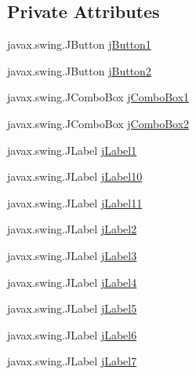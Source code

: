 \subsection*{Private Attributes}
\begin{DoxyCompactItemize}
\item 
javax.\+swing.\+J\+Button \mbox{\hyperlink{class_interfaz_package_1_1_alta_libro_texto_a22a96730cf3c923a67cc8ef92053d06a}{j\+Button1}}
\item 
javax.\+swing.\+J\+Button \mbox{\hyperlink{class_interfaz_package_1_1_alta_libro_texto_a2a68befdaadc6870fcd31afa3214839b}{j\+Button2}}
\item 
javax.\+swing.\+J\+Combo\+Box \mbox{\hyperlink{class_interfaz_package_1_1_alta_libro_texto_a3413630b2b16f449c4ea9455da599211}{j\+Combo\+Box1}}
\item 
javax.\+swing.\+J\+Combo\+Box \mbox{\hyperlink{class_interfaz_package_1_1_alta_libro_texto_a49e7ef058be95fcf124448e008bec61f}{j\+Combo\+Box2}}
\item 
javax.\+swing.\+J\+Label \mbox{\hyperlink{class_interfaz_package_1_1_alta_libro_texto_a9cd5322905fec64c6411d5c05d635d3c}{j\+Label1}}
\item 
javax.\+swing.\+J\+Label \mbox{\hyperlink{class_interfaz_package_1_1_alta_libro_texto_a7a931dd787f522e40bea361927d6bd1b}{j\+Label10}}
\item 
javax.\+swing.\+J\+Label \mbox{\hyperlink{class_interfaz_package_1_1_alta_libro_texto_a162463c516b899f292e7b5b96e2daeb2}{j\+Label11}}
\item 
javax.\+swing.\+J\+Label \mbox{\hyperlink{class_interfaz_package_1_1_alta_libro_texto_a627fbe8c20773d8c99f935168bdee2a2}{j\+Label2}}
\item 
javax.\+swing.\+J\+Label \mbox{\hyperlink{class_interfaz_package_1_1_alta_libro_texto_a28fbe18428baff77e3ba378260ed8de2}{j\+Label3}}
\item 
javax.\+swing.\+J\+Label \mbox{\hyperlink{class_interfaz_package_1_1_alta_libro_texto_a600b84f835ee7c6e403742afe1817957}{j\+Label4}}
\item 
javax.\+swing.\+J\+Label \mbox{\hyperlink{class_interfaz_package_1_1_alta_libro_texto_a2601c4eaa8dbee3dc1de4d81e78f356c}{j\+Label5}}
\item 
javax.\+swing.\+J\+Label \mbox{\hyperlink{class_interfaz_package_1_1_alta_libro_texto_afe4738d8f372b4cbc512e677ee55c159}{j\+Label6}}
\item 
javax.\+swing.\+J\+Label \mbox{\hyperlink{class_interfaz_package_1_1_alta_libro_texto_a2ad918dee833595289fcf66c1d1933ef}{j\+Label7}}

\end{DoxyCompactItemize}
